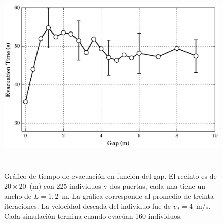 \begin{figure}[H]
    \centering
    \includegraphics[height=9.7cm]{figuras/gap_vste_225_v4_big.eps}
    \caption[width=5cm]{Gráfico de tiempo de evacuación en función del gap. El recinto es de $20\times 20$~(m) con 225 individuos y dos puertas, cada una tiene un ancho de $L=1,2$~m. La gráfica corresponde al promedio de treinta iteraciones. La velocidad deseada del individuo fue de $v_d=4$~m/s. Cada simulación termina cuando evacúan 160 individuos.}
    \label{gap_vste_225_v4}
\end{figure}


